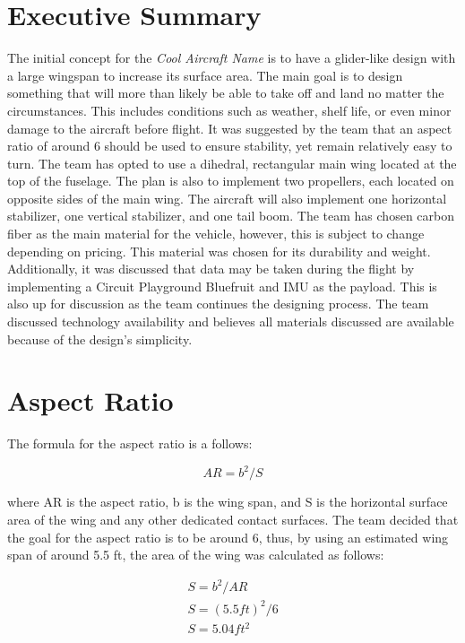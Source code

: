 \documentclass[footheight=20pt, footsepline, headheight=20pt, headsepline]{scrartcl}
\begin{document}
\section{Executive Summary}
{The initial concept for the \textit{Cool Aircraft Name} is to have a glider-like design with a large wingspan to increase its surface area. The main goal is to design something that will more than likely be able to take off and land no matter the circumstances. This includes conditions such as weather, shelf life, or even minor damage to the aircraft before flight. It was suggested by the team that an aspect ratio of around 6 should be used to ensure stability, yet remain relatively easy to turn. The team has opted to use a dihedral, rectangular main wing located at the top of the fuselage. The plan is also to implement two propellers, each located on opposite sides of the main wing. The aircraft will also implement one horizontal stabilizer, one vertical stabilizer, and one tail boom. The team has chosen carbon fiber as the main material for the vehicle, however, this is subject to change depending on pricing. This material was chosen for its durability and weight. Additionally, it was discussed that data may be taken during the flight by implementing a Circuit Playground Bluefruit and IMU as the payload. This is also up for discussion as the team continues the designing process. The team discussed technology availability and believes all materials discussed are available because of the design's simplicity.} 
\section{Aspect Ratio}
The formula for the aspect ratio is a follows:\begin{center}
\begin{equation}
AR = b^2/S
\end{equation}
\end{center}
where AR is the aspect ratio, b is the wing span, and S is the horizontal surface area of the wing and any other dedicated contact surfaces. The team decided that the goal for the aspect ratio is to be around 6, thus, by using an estimated wing span of around 5.5 ft, the area of the wing was calculated as follows:

\begin{equation}
\begin{array}{lcl}
S = b^2/AR \\
S = (5.5 ft)^2 /6 \\
S = 5.04 ft^2
\end{array}
\end{equation}
\end{document}

